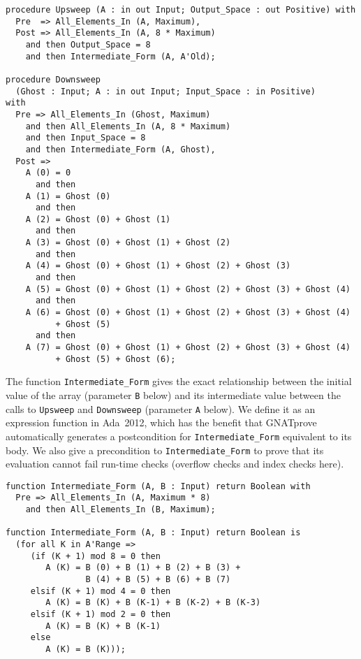 \documentclass[sttt,draft]{svjour}
\newcommand{\gnatprove}{GNATprove\xspace}
\newcommand{\adatwtw}{Ada~2012\xspace}
\begin{document}
\begin{footnotesize}
\begin{verbatim}
procedure Upsweep (A : in out Input; Output_Space : out Positive) with
  Pre  => All_Elements_In (A, Maximum),
  Post => All_Elements_In (A, 8 * Maximum)
    and then Output_Space = 8
    and then Intermediate_Form (A, A'Old);

procedure Downsweep
  (Ghost : Input; A : in out Input; Input_Space : in Positive)
with
  Pre => All_Elements_In (Ghost, Maximum)
    and then All_Elements_In (A, 8 * Maximum)
    and then Input_Space = 8
    and then Intermediate_Form (A, Ghost),
  Post =>
    A (0) = 0
      and then
    A (1) = Ghost (0)
      and then
    A (2) = Ghost (0) + Ghost (1)
      and then
    A (3) = Ghost (0) + Ghost (1) + Ghost (2)
      and then
    A (4) = Ghost (0) + Ghost (1) + Ghost (2) + Ghost (3)
      and then
    A (5) = Ghost (0) + Ghost (1) + Ghost (2) + Ghost (3) + Ghost (4)
      and then
    A (6) = Ghost (0) + Ghost (1) + Ghost (2) + Ghost (3) + Ghost (4)
          + Ghost (5)
      and then
    A (7) = Ghost (0) + Ghost (1) + Ghost (2) + Ghost (3) + Ghost (4)
          + Ghost (5) + Ghost (6);
\end{verbatim}
\end{footnotesize}

The function \verb|Intermediate_Form| gives the exact relationship between the
initial value of the array (parameter \verb|B| below) and its intermediate
value between the calls to \verb|Upsweep| and \verb|Downsweep| (parameter
\verb|A| below). We define it as an expression function in \adatwtw, which has
the benefit that \gnatprove automatically generates a postcondition for
\verb|Intermediate_Form| equivalent to its body. We also give a precondition to
\verb|Intermediate_Form| to prove that its evaluation cannot fail run-time
checks (overflow checks and index checks here).

\begin{footnotesize}
\begin{verbatim}
function Intermediate_Form (A, B : Input) return Boolean with
  Pre => All_Elements_In (A, Maximum * 8)
    and then All_Elements_In (B, Maximum);

function Intermediate_Form (A, B : Input) return Boolean is
  (for all K in A'Range =>
     (if (K + 1) mod 8 = 0 then
        A (K) = B (0) + B (1) + B (2) + B (3) +
                B (4) + B (5) + B (6) + B (7)
     elsif (K + 1) mod 4 = 0 then
        A (K) = B (K) + B (K-1) + B (K-2) + B (K-3)
     elsif (K + 1) mod 2 = 0 then
        A (K) = B (K) + B (K-1)
     else
        A (K) = B (K)));
\end{verbatim}
\end{footnotesize}
\end{document}
